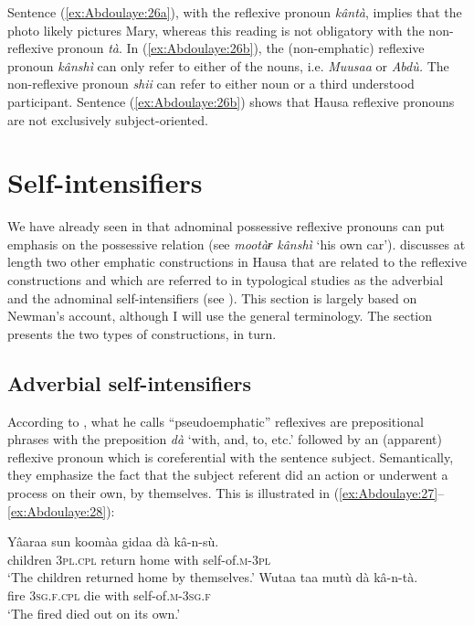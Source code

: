 \documentclass[output=paper]{langscibook}
\begin{document}
        


Sentence (\ref{ex:Abdoulaye:26a}), with the reflexive pronoun \textit{kântà}, implies that the photo likely pictures Mary, whereas this reading is not obligatory with the non-reflexive pronoun \textit{tà}. In (\ref{ex:Abdoulaye:26b}), the (non-emphatic) reflexive pronoun \textit{kânshì} can only refer to either of the nouns, i.e. \textit{Muusaa} or \textit{Abdù.} The non-reflexive pronoun \textit{shii} can refer to either noun or a third understood participant. Sentence (\ref{ex:Abdoulaye:26b}) shows that Hausa reflexive pronouns are not exclusively subject-oriented.

\section{Self-intensifiers} \label{sec:Abdoulaye:6}

We have already seen in  that adnominal possessive reflexive pronouns can put emphasis on the possessive relation (see \textit{mootàɍ} \textit{kânshì} ‘his own car’). \citet{Newman2000} discusses at length two other emphatic constructions in Hausa that are related to the reflexive constructions and which are referred to in typological studies as the adverbial and the adnominal self-intensifiers (see \citealt[43]{KoenigSiemund1999}). This section is largely based on Newman’s account, although I will use the general terminology. The section presents the two types of constructions, in turn.

\subsection{Adverbial self-intensifiers} \label{sec:Abdoulaye:6.1}

According to \citet[526]{Newman2000}, what he calls “pseudoemphatic” reflexives are prepositional phrases with the preposition \textit{dà} ‘with, and, to, etc.’ followed by an (apparent) reflexive pronoun which is coreferential with the sentence subject. Semantically, they emphasize the fact that the subject referent did an action or underwent a process on their own, by themselves. This is illustrated in (\ref{ex:Abdoulaye:27}--\ref{ex:Abdoulaye:28}):


\ea%
    \label{ex:Abdoulaye:27}
    \ea \label{ex:Abdoulaye:27a}
    \gll Yâaraa  sun  koomàa  gidaa  dà  kâ-n-sù.\\
    children  \textsc{3pl.cpl}  return  home  with  self-of.\textsc{m-3pl}\\
    \glt `The children returned home by themselves.’
    \ex \label{ex:Abdoulaye:27b}
    \gll Wutaa  taa  mutù  dà  kâ-n-tà.\\
    fire  \textsc{3sg.f.cpl}  die  with  self-of.\textsc{m-3sg.f}\\
    \glt `The fired died out on its own.’
    \z
\z
\end{document}
